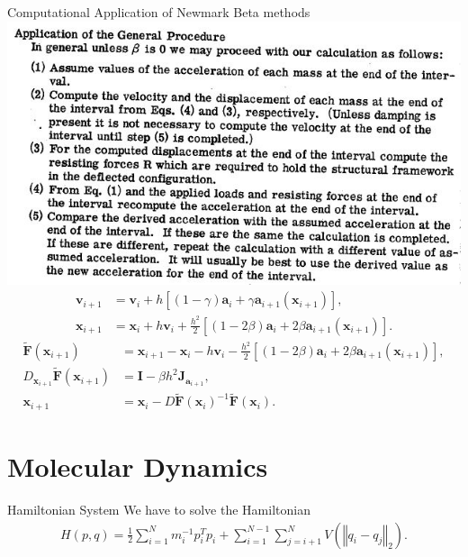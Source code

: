 \documentclass{beamer}
\renewcommand{\vec}[1]{\mathbf{#1}}
\begin{document}
\begin{frame}{Computational Application of Newmark Beta methods}
 {
	\includegraphics[width=\textwidth, angle=1]{newmark-beta_algorithm_original}
}
 {
	\begin{align*}
			\vec{v}_{i+1} & = \vec{v}_{i} + h\left[\left(1-\gamma\right)\vec{a}_{i} + \gamma\vec{a}_{i+1}\left(\vec{x}_{i+1}\right)\right], \\
			\vec{x}_{i+1} & = \vec{x}_{i} + h\vec{v}_{i} + \frac{h^2}{2}\left[\left(1-2\beta \right)\vec{a}_{i} + 2\beta\vec{a}_{i+1}\left(\vec{x}_{i+1}\right)\right]. 
	\end{align*}
	\dotfill
	\medskip
	\begin{align*}
		\vec{\tilde{F}}\left(\vec{x}_{i+1}\right) & = \vec{x}_{i+1} - \vec{x}_{i} -h\vec{v}_{i} - \frac{h^{2}}{2}\left[\left(1-2\beta\right)\vec{a}_{i} + 2\beta\vec{a}_{i+1}\left(\vec{x}_{i+1}\right)\right], \nonumber \\
		D_{\vec{x}_{i+1}}\vec{\tilde{F}}\left(\vec{x}_{i+1}\right) & = \textbf{I} -  \beta h^{2}\textbf{J}_{\vec{a}_{i+1}},\nonumber \\
		\vec{x}_{i+1} & = \vec{x}_{i} - D\vec{\tilde{F}}\left(\vec{x}_{i}\right)^{-1}\vec{\tilde{F}}\left(\vec{x}_{i}\right).
	\end{align*}
}
\end{frame}

\section{Molecular Dynamics}

\begin{frame}{Hamiltonian System}
We have to solve the Hamiltonian
\medskip
\begin{align*}
	H(p, q) = \frac{1}{2}\sum_{i = 1}^{N} m_{i}^{-1}p_{i}^{T}p_{i} + \sum_{i=1}^{N-1} \sum_{j=i+1}^{N} V\left(\left\Vert q_{i} - q_{j} \right\Vert_{2}\right).
\end{align*}
\end{frame}
\end{document}
